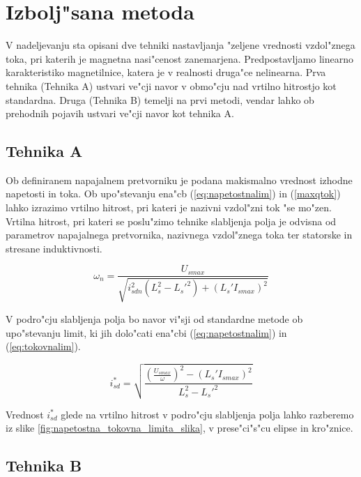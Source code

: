 \documentclass[journal,a4paper,twoside]{sty/IEEEtran}
\begin{document}
\section{Izbolj"sana metoda}



V nadeljevanju sta opisani dve tehniki nastavljanja "zeljene vrednosti vzdol"znega toka, pri katerih je magnetna nasi"cenost zanemarjena. Predpostavljamo linearno karakteristiko magnetilnice, katera je v realnosti druga"ce nelinearna. Prva tehnika (Tehnika A) ustvari ve"cji navor v obmo"cju nad vrtilno hitrostjo kot standardna. Druga (Tehnika B) temelji na prvi metodi, vendar lahko ob prehodnih pojavih ustvari ve"cji navor kot tehnika A.\cite{vas}

\subsection{Tehnika A}
\label{sec:prva_metoda}


Ob definiranem napajalnem pretvorniku je podana makismalno vrednost izhodne napetosti in toka. Ob upo"stevanju ena"cb (\ref{eq:napetostnalim}) in (\ref{maxqtok}) lahko izrazimo vrtilno hitrost, pri kateri je nazivni vzdol"zni tok "se mo"zen. Vrtilna hitrost, pri kateri se poslu"zimo tehnike slabljenja polja je odvisna od parametrov napajalnega pretvornika, nazivnega vzdol"znega toka ter statorske in stresane induktivnosti. 

\begin{equation}
\omega_n=\frac{{U}_{smax}}{\sqrt{i_{sdn}^{2}(L_s^2-L_s'^2)+(L_s'I_{smax})^2}}
\label{nazivnaw}
\end{equation}



V podro"cju slabljenja polja bo navor vi"sji od standardne metode ob upo"stevanju limit, ki jih dolo"cati ena"cbi (\ref{eq:napetostnalim}) in (\ref{eq:tokovnalim}). 

\begin{equation}
\label{eq:zeljentok1}
i_{sd}^*=\sqrt{\frac{(\frac{U_{smax}}{\omega})^2-(L_s'I_{smax})^2}{L_s^2-L_s'^2}}
\end{equation}

Vrednost $i_{sd}^*$ glede na vrtilno hitrost v podro"cju slabljenja polja lahko razberemo iz slike \ref{fig:napetostna_tokovna_limita_slika}, v prese"ci"s"cu elipse in kro"znice. 



\subsection{Tehnika B}
\label{sec:druga_metoda}
\end{document}
